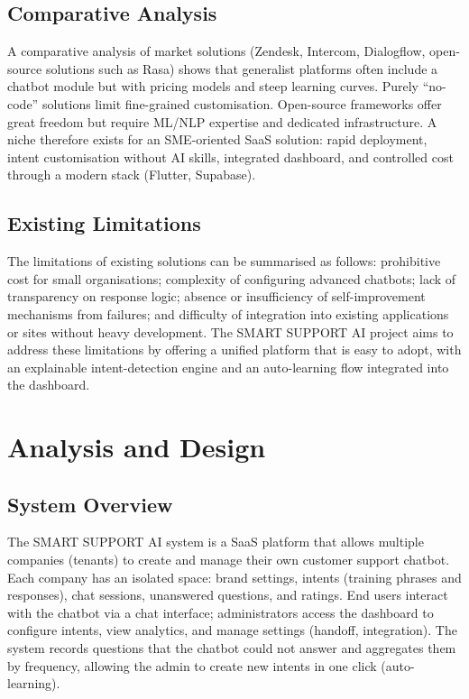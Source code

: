 \documentclass[12pt,a4paper]{report}
\begin{document}
\section{Comparative Analysis}

A comparative analysis of market solutions (Zendesk, Intercom, Dialogflow, open-source solutions such as Rasa) shows that generalist platforms often include a chatbot module but with pricing models and steep learning curves. Purely ``no-code'' solutions limit fine-grained customisation. Open-source frameworks offer great freedom but require ML/NLP expertise and dedicated infrastructure. A niche therefore exists for an SME-oriented SaaS solution: rapid deployment, intent customisation without AI skills, integrated dashboard, and controlled cost through a modern stack (Flutter, Supabase).

\section{Existing Limitations}

The limitations of existing solutions can be summarised as follows: prohibitive cost for small organisations; complexity of configuring advanced chatbots; lack of transparency on response logic; absence or insufficiency of self-improvement mechanisms from failures; and difficulty of integration into existing applications or sites without heavy development. The SMART SUPPORT AI project aims to address these limitations by offering a unified platform that is easy to adopt, with an explainable intent-detection engine and an auto-learning flow integrated into the dashboard.

\chapter{Analysis and Design}

\section{System Overview}

The SMART SUPPORT AI system is a SaaS platform that allows multiple companies (tenants) to create and manage their own customer support chatbot. Each company has an isolated space: brand settings, intents (training phrases and responses), chat sessions, unanswered questions, and ratings. End users interact with the chatbot via a chat interface; administrators access the dashboard to configure intents, view analytics, and manage settings (handoff, integration). The system records questions that the chatbot could not answer and aggregates them by frequency, allowing the admin to create new intents in one click (auto-learning).
\end{document}
